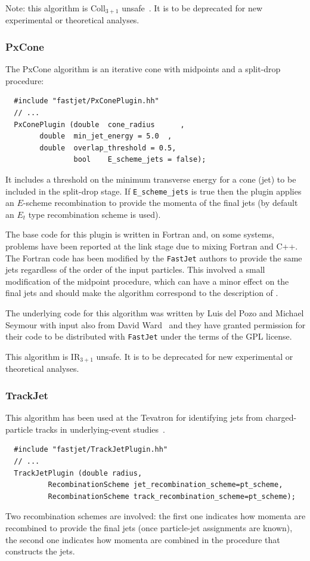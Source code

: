 \documentclass[12pt,a4]{article}
\newcommand{\fastjet}{\texttt{FastJet}\xspace}
\begin{document}
Note: this algorithm is Coll$_{3+1}$ unsafe~\cite{antikt}. It is to be
deprecated for new experimental or theoretical analyses.



\subsubsection{PxCone}

The PxCone algorithm is an iterative cone with midpoints and a
split-drop procedure:
\begin{lstlisting}
  #include "fastjet/PxConePlugin.hh"
  // ...
  PxConePlugin (double  cone_radius      , 
		double  min_jet_energy = 5.0  , 
		double  overlap_threshold = 0.5,
                bool    E_scheme_jets = false); 
\end{lstlisting}
It includes a threshold on the minimum transverse energy for a cone
(jet) to be included in the split-drop stage.
%
If \verb|E_scheme_jets| is true then the plugin applies an $E$-scheme
recombination to provide the momenta of the final jets (by default an
$E_t$ type recombination scheme is used).

The base code for this plugin is written in Fortran and, on some
systems, problems have been reported at the link stage due to mixing
Fortran and C++.
%
The Fortran code has been modified by the \fastjet authors to provide
the same jets regardless of the order of the input particles.
%
This involved a small modification of the midpoint procedure, which
can have a minor effect on the final jets and should make the algorithm
correspond to the description of \cite{Seymour:2006vv}.

The underlying code for this algorithm was written by Luis del Pozo
and Michael Seymour with input also from David Ward~\cite{PxCone}
%
and they have granted permission for their code to be distributed with
\fastjet under the terms of the GPL license.

This algorithm is IR$_{3+1}$ unsafe. It is to be deprecated for
new experimental or theoretical analyses.


\subsubsection{TrackJet}
%
This algorithm has been used at the Tevatron for identifying jets from
charged-particle tracks in underlying-event studies~\cite{Affolder:2001xt}.
%
\begin{lstlisting}
  #include "fastjet/TrackJetPlugin.hh"
  // ...
  TrackJetPlugin (double radius, 
		  RecombinationScheme jet_recombination_scheme=pt_scheme, 
		  RecombinationScheme track_recombination_scheme=pt_scheme);
\end{lstlisting}
Two recombination schemes are involved: the first one indicates how
momenta are recombined to provide the final jets (once particle-jet
assignments are known), the second one indicates how momenta are
combined in the procedure that constructs the jets.
\end{document}
